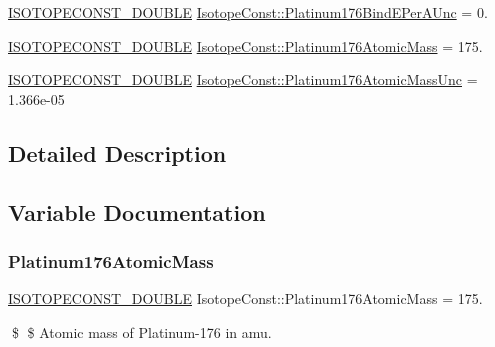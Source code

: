 \begin{DoxyCompactItemize}
\mbox{\hyperlink{group___isotope_const-_macros_ga8f45a7272ce02c0b4c65c44636ed719a}{I\+S\+O\+T\+O\+P\+E\+C\+O\+N\+S\+T\+\_\+\+D\+O\+U\+B\+LE}} \mbox{\hyperlink{group___isotope_const-_platinum-_pt176_gac5ee6acffc526535f536ba5af8acce0a}{Isotope\+Const\+::\+Platinum176\+Bind\+E\+Per\+A\+Unc}} = 0.
\item 
\mbox{\hyperlink{group___isotope_const-_macros_ga8f45a7272ce02c0b4c65c44636ed719a}{I\+S\+O\+T\+O\+P\+E\+C\+O\+N\+S\+T\+\_\+\+D\+O\+U\+B\+LE}} \mbox{\hyperlink{group___isotope_const-_platinum-_pt176_ga5bf513183d8a35e51cb2ec9653aa59d5}{Isotope\+Const\+::\+Platinum176\+Atomic\+Mass}} = 175.
\item 
\mbox{\hyperlink{group___isotope_const-_macros_ga8f45a7272ce02c0b4c65c44636ed719a}{I\+S\+O\+T\+O\+P\+E\+C\+O\+N\+S\+T\+\_\+\+D\+O\+U\+B\+LE}} \mbox{\hyperlink{group___isotope_const-_platinum-_pt176_ga1f1ce2e9e21eb62211afb8309322dd04}{Isotope\+Const\+::\+Platinum176\+Atomic\+Mass\+Unc}} = 1.\+366e-\/05
\end{DoxyCompactItemize}


\subsection{Detailed Description}


\subsection{Variable Documentation}
\mbox{\label{group___isotope_const-_platinum-_pt176_ga5bf513183d8a35e51cb2ec9653aa59d5}} 
\subsubsection{\texorpdfstring{Platinum176\+Atomic\+Mass}{Platinum176AtomicMass}}
{\footnotesize\ttfamily \mbox{\hyperlink{group___isotope_const-_macros_ga8f45a7272ce02c0b4c65c44636ed719a}{I\+S\+O\+T\+O\+P\+E\+C\+O\+N\+S\+T\+\_\+\+D\+O\+U\+B\+LE}} Isotope\+Const\+::\+Platinum176\+Atomic\+Mass = 175.}

\$ \$ Atomic mass of Platinum-\/176 in amu. \mbox{\label{group___isotope_const-_platinum-_pt176_ga1f1ce2e9e21eb62211afb8309322dd04}} 
